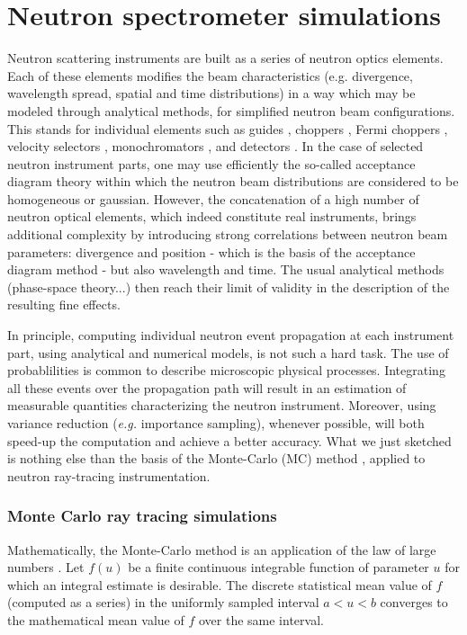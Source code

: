 \section{Neutron spectrometer simulations}

Neutron scattering instruments are built as a series of neutron optics elements. 
Each of these elements modifies the beam characteristics 
(e.g. divergence, wavelength spread, spatial and time distributions) 
in a way which may be modeled through analytical methods, 
for simplified neutron beam configurations.
This stands for individual elements such as guides \cite{Leibnitz63,Mildner90}, 
choppers \cite{Lowde60,Copley03}, Fermi choppers \cite{Fermi47,Peters05}, 
velocity selectors \cite{Clark66}, 
monochromators \cite{Freund83,Sears97,Shirane02,Alianelli04}, 
and detectors \cite{Radeka74,Charpak89,Manzin04}.
In the case of selected neutron instrument parts, one may use efficiently 
the so-called acceptance diagram theory \cite{Mildner90,Copley93,Cussen03} 
within which the neutron beam distributions are considered to be homogeneous 
or gaussian.
However, the concatenation of a high number of neutron optical elements, 
which indeed constitute real instruments, brings additional complexity 
by introducing strong correlations between neutron beam parameters: 
divergence and position - which is the basis of the acceptance diagram method - 
but also wavelength and time. 
The usual analytical methods (phase-space theory...) then reach their limit 
of validity in the description of the resulting fine effects.

In principle, computing individual neutron event propagation 
at each instrument part, using analytical and numerical models, 
is not such a hard task. 
The use of probablilities is common to describe microscopic physical processes. 
Integrating all these events over the propagation path will result 
in an estimation of measurable quantities characterizing the neutron instrument. 
Moreover, using variance reduction ({\it e.g.} importance sampling), 
whenever possible, will both speed-up the computation and achieve 
a better accuracy. What we just sketched is nothing else than the basis 
of the Monte-Carlo (MC) method \cite{James80}, 
applied to neutron ray-tracing instrumentation.

\subsubsection{Monte Carlo ray tracing simulations}
Mathematically, the Monte-Carlo method is an application of the law of large numbers \cite{James80,Grimmett92}. Let $f(u)$ be a finite continuous integrable function of parameter $u$ for which an integral estimate is desirable. The discrete statistical mean value of $f$ (computed as a series) in the uniformly sampled interval $a < u < b$ converges to the mathematical mean value of $f$ over the same interval.

